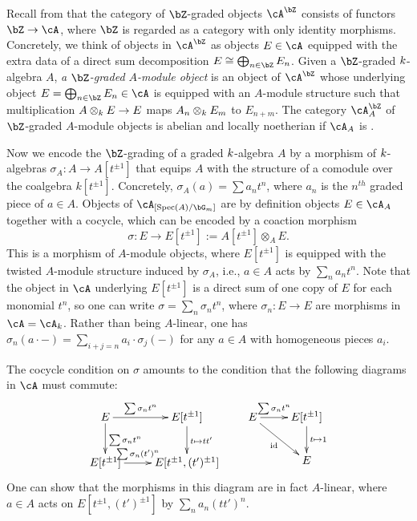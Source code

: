 \documentclass[a4paper]{amsart}
\numberwithin{equation}{section}
\theoremstyle{plain}
\theoremstyle{definition}
\DeclareMathOperator{\Spec}{Spec}
\DeclareMathOperator{\id}{id}
\newcommand{\tensor}{\otimes}
\begin{document}
Recall from \cite[\S B7]{artin-zhang} that the category of $\bZ$-graded objects $\cA^{\bZ}$ consists of functors $\bZ \to \cA$, where $\bZ$ is regarded as a category with only identity morphisms. Concretely, we think of objects in $\cA^{\bZ}$ as objects $E \in \cA$ equipped with the extra data of a direct sum decomposition $E \cong \bigoplus_{n \in \bZ} E_n$. Given a $\bZ$-graded ${k}$-algebra $A$, \emph{a $\bZ$-graded $A$-module object} is an object of $\cA^{\bZ}$ whose underlying object $E = \bigoplus_{n \in \bZ} E_n \in \cA$ is equipped with an $A$-module structure such that  multiplication $A \tensor_\base E \to E$ maps $A_n \tensor_\base E_m$ to $E_{n+m}$.
The category $\cA_A^{\bZ}$ of $\bZ$-graded $A$-module objects is abelian and locally noetherian if $\cA_A$ is \cite[Prop.~B7.5]{artin-zhang}. 

Now we encode the $\bZ$-grading of a graded ${k}$-algebra $A$ by a morphism of $k$-algebras $\sigma_A : A \to A[t^{\pm 1}]$ that equips $A$ with the structure of a comodule over the coalgebra $k[t^{\pm 1}]$. Concretely, $\sigma_A(a)=\sum a_n t^n$, where $a_n$ is the $n^{th}$ graded piece of $a \in A$. Objects of $\cA_{[\Spec(A)/\bG_m]}$ are by definition  objects $E \in \cA_A$ together with a cocycle, which can be encoded by a coaction morphism \[\sigma : E \to E[t^{\pm1}] := A[t^{\pm 1}] \tensor_A E.\]
This is a morphism of $A$-module objects, where $E[t^{\pm1}]$ is equipped with the twisted $A$-module structure induced by $\sigma_A$, i.e., $a \in A$ acts by $\sum_n a_n t^n$. Note that the object in $\cA$ underlying $E[t^{\pm1}]$ is a direct sum of one copy of $E$ for each monomial $t^n$, so one can write $\sigma = \sum_n \sigma_n t^n$, where $\sigma_n : E \to E$ are morphisms in $\cA = \cA_k$. Rather than being $A$-linear, one has $\sigma_n(a \cdot -) = \sum_{i+j=n} a_i \cdot \sigma_j(-)$ for any $a \in A$ with homogeneous pieces $a_i$.

The cocycle condition on $\sigma$ amounts to the condition that the following diagrams in $\cA$ must commute:
\begin{equation} \label{E:coaction}
\xymatrix{
	E \ar[r]^-{\sum \sigma_n t^n} \ar[d]^{\sum \sigma_n t^n} & E[t^{\pm 1}] \ar[d]^{t \mapsto t t'} \\
	E[t^{\pm1}] \ar[r]^-{\sum \sigma_n (t')^n} & E[t^{\pm1},(t')^{\pm1}]
}
\qquad
\xymatrix{
	E \ar[r]^-{\sum \sigma_n t^n} \ar[rd]_{\id}					& E[t^{\pm1}] \ar[d]^{t \mapsto 1}\\
	&  E
}
\end{equation}
One can show that the morphisms in this diagram are in fact $A$-linear, where $a \in A$ acts on $E[t^{\pm1},(t')^{\pm1}]$ by $\sum_n a_n (tt')^n$.
\end{document}
